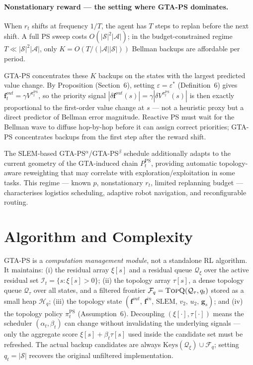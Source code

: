 \documentclass[10pt,a4paper]{article}
\begin{document}
\paragraph{Nonstationary reward --- the setting where GTA-PS dominates.}
When $r_t$ shifts at frequency $1/T$, the agent has $T$ steps to replan before the
next shift.  A full PS sweep costs $O(|\mathcal{S}|^2|\mathcal{A}|)$; in the
budget-constrained regime $T \ll |\mathcal{S}|^2|\mathcal{A}|$, only
$K = O(T/(|\mathcal{A}||\mathcal{S}|))$ Bellman backups are affordable per period.

GTA-PS concentrates these $K$ backups on the states with the largest predicted value
change.  By Proposition (Section~6), setting $\varepsilon = \varepsilon^*$ (Definition~6) gives
$\mathbf{f}^{out}_t = \gamma V^{\pi^{\mathrm{PS}}_t}$, so the priority signal
$|\delta\mathbf{f}^{out}(s)| = \gamma|\delta V^{\pi^{\mathrm{PS}}_t}(s)|$ is then exactly proportional
to the first-order value change at $s$ --- not a heuristic proxy but a direct
predictor of Bellman error magnitude.  Reactive PS must wait for the Bellman wave to
diffuse hop-by-hop before it can assign correct priorities; GTA-PS concentrates backups from
the first step after the reward shift.

The SLEM-based GTA-PS$^{\alpha}$/GTA-PS$^{\beta}$ schedule additionally adapts to the current
geometry of the GTA-induced chain $P_t^{\mathrm{PS}}$, providing automatic topology-aware
reweighting that may correlate with exploration/exploitation in some tasks.  This regime --- known $p$,
nonstationary $r_t$, limited replanning budget --- characterises logistics scheduling,
adaptive robot navigation, and reconfigurable routing.




\section{Algorithm and Complexity}

GTA-PS is a \textit{computation management module}, not a standalone RL algorithm.
It maintains: (i) the residual array $\xi[s]$ and a residual queue $\mathcal{Q}_{\xi}$ over the active residual set $\mathcal{I}_t=\{s:\xi[s]>0\}$; (ii) the topology array $\tau[s]$, a dense topology queue $\mathcal{Q}_{\tau}$ over all states, and a filtered frontier $\mathcal{F}_q=\textsc{TopQ}(\mathcal{Q}_{\tau},q_t)$ stored as a small heap $\mathcal{H}_q$; (iii) the topology state $(\mathbf{f}^{out},\, \mathbf{f}^{in},\, \mathrm{SLEM},\, v_2,\, u_2,\, \mathbf{g}_s)$; and (iv) the topology policy $\pi^{\mathrm{PS}}_t$ (Assumption~6).
Decoupling $(\xi[\cdot],\tau[\cdot])$ means the scheduler $(\alpha_t,\beta_t)$ can change without invalidating the underlying signals --- only the aggregate score $\xi[s]+\beta_t\tau[s]$ used inside the candidate set must be refreshed.
The actual backup candidates are always $\mathrm{Keys}(\mathcal{Q}_{\xi}) \cup \mathcal{F}_q$; setting $q_t=|\mathcal{S}|$ recovers the original unfiltered implementation.
\end{document}
